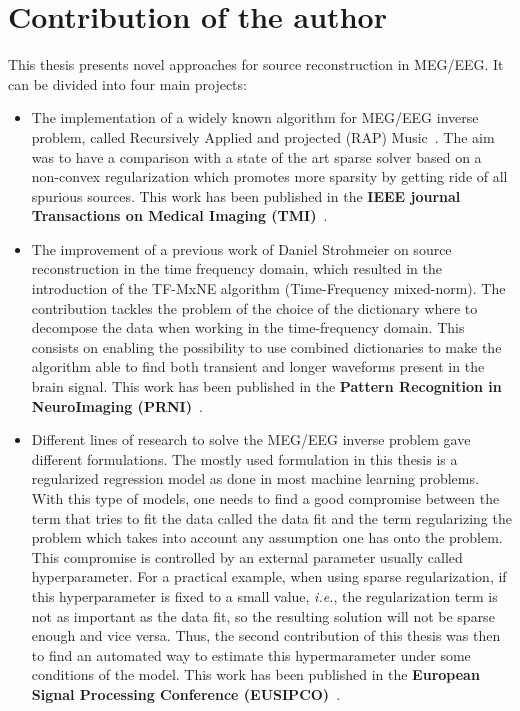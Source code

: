 \section*{Contribution of the author}
This thesis presents novel approaches for source reconstruction in MEG/EEG. It can be divided into four main projects:
\begin{itemize}
\item The implementation of a widely known algorithm for MEG/EEG inverse problem, called Recursively Applied and projected (RAP) Music~\cite{mosher-leahy:1999}. The aim was to have a comparison with a state of the art sparse solver based on a non-convex regularization which promotes more sparsity by getting ride of all spurious sources. This work has been published in the \textbf{IEEE journal Transactions on Medical Imaging (TMI)}~\cite{strohmeier-etal:16}.

\item The improvement of a previous work of Daniel Strohmeier on source reconstruction in the time frequency domain, which resulted in the introduction of the TF-MxNE algorithm (Time-Frequency mixed-norm). The contribution tackles the problem of the choice of the dictionary where to decompose the data when working in the time-frequency domain. This consists on enabling the possibility to use combined dictionaries to make the algorithm able to find both transient and longer waveforms present in the brain signal. This work has been published in the \textbf{Pattern Recognition in NeuroImaging (PRNI)}~\cite{bekhti2016m}.

\item Different lines of research to solve the MEG/EEG inverse problem gave different formulations. The mostly used formulation in this thesis is a regularized regression model as done in most machine learning problems. With this type of models, one needs to find a good compromise between the term that tries to fit the data called the data fit and the term regularizing the problem which takes into account any assumption one has onto the problem. This compromise is controlled by an external parameter usually called hyperparameter. For a practical example, when using sparse regularization, if this hyperparameter is fixed to a small value, \textit{i.e.}, the regularization term is not as important as the data fit, so the resulting solution will not be sparse enough and vice versa. Thus, the second contribution of this thesis was then to find an automated way to estimate this hypermarameter under some conditions of the model. This work has been published in the \textbf{European Signal Processing Conference (EUSIPCO)}~\cite{bekhti_eusipco}.


\end{itemize}
